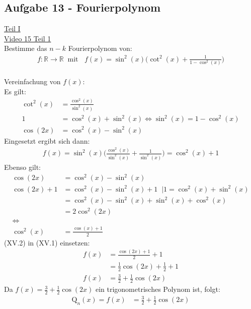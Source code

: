 \subsection{Aufgabe 13 - Fourierpolynom}
\underline{Teil I}\\
\href{https://youtu.be/eVy5SC3mWBM}{Video 15 Teil 1}\\
Bestimme das $ n-k $ Fourierpolynom von:\\
\begin{align*}
f:\mathbb{R}\rightarrow\mathbb{R} \;\;\text{mit  }\;\; f(x)=\sin^2(x)\bigg(\cot^2(x)+\frac{1}{1-\cos^2(x)}\bigg)
\end{align*}
\\
Vereinfachung von $ f(x) $:\\
Es gilt:\\
\begin{align*}
\cot^2(x)&=\frac{\cos^2(x)}{\sin^2(x)}\\
1&=\cos^2(x)+\sin^2(x)\Leftrightarrow\sin^2(x)=1-\cos^2(x)\\
\cos(2x)&=\cos^2(x)-\sin^2(x)
\end{align*}
Eingesetzt ergibt sich dann:\\
\begin{align}
f(x)=\sin^2(x)\bigg(\frac{\cos^2(x)}{\sin^2(x)}+\frac{1}{\sin^2(x)}\bigg)=\cos^2(x)+1 \label{x1}
\end{align}
Ebenso gilt:\\
\begin{align}
\cos(2x)&=\cos^2(x)-\sin^2(x) \nonumber\\
\cos(2x)+1&=\cos^2(x)-\sin^2(x)+1\;\;|\scriptscriptstyle 1=\cos^2(x)+\sin^2(x)\nonumber\\
&=\cos^2(x)-\sin^2(x)+\sin^2(x)+\cos^2(x)\nonumber\\
&=2\cos^2(2x)\nonumber\\
\Leftrightarrow\nonumber\\
\cos^2(x)&=\frac{\cos(x)+1}{2}
\end{align}
(XV.2) in (XV.1) einsetzen:\\
\begin{align*}
f(x)&=\frac{\cos(2x)+1}{2}+1\\&=\frac{1}{2}\cos(2x)+\frac{1}{2}+1\\
f(x)&=\frac{3}{2}+\frac{1}{2}\cos(2x)
\end{align*}
Da $ f(x)=\frac{3}{2}+\frac{1}{2}\cos(2x) $ ein trigonometrisches Polynom ist, folgt:\\
\begin{align*}
\mathrm{Q}_n(x)=f(x)&=\frac{3}{2}+\frac{1}{2}\cos(2x)
\end{align*}
